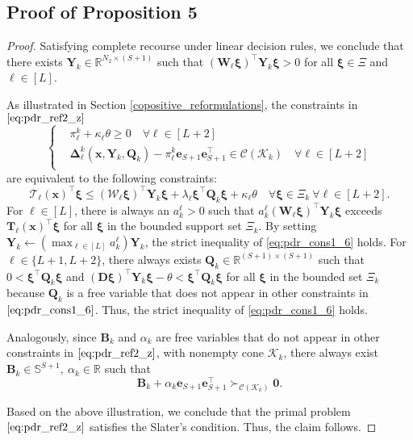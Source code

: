 \documentclass{article}
\newcommand{\RR}{\mathbb{R}}
\begin{document}
\subsection{Proof of Proposition 5}
\begin{proof}
Satisfying complete recourse under linear decision rules, we conclude that there exists $\bm Y_k \in \RR^{N_2 \times (S+1)}$ such that $(\bm W_\ell\bm \xi)^\top \bm Y_k \bm \xi > 0$ for all $\bm \xi \in \Xi$ and $\ell \in [L]$.

As illustrated in Section \ref{copositive_reformulations}, the constraints in $\eqref{eq:pdr_ref2_z}$
\begin{equation*}
\left \{
\begin{aligned}
 & \pi^k_\ell + \kappa_\ell \theta \geq 0 \quad \forall \ell \in [L+2] \\
 & \bm \Delta^k_\ell(\bm x,\bm Y_k,\bm Q_k) - \pi^k_\ell \mathbf{e}_{S+1} \mathbf{e}_{S+1}^\top 
\in \mathcal{C} (\mathcal K_k) \quad \forall \ell \in [L+2]  \\
\end{aligned}
\right.
\end{equation*}
are equivalent to the following constraints:
\begin{equation}
\label{eq:pdr_cons1_6}
\bm{\mathcal{T}}_\ell (\bm x)^\top\bm \xi  \leq (\bm{\mathcal{W}}_\ell \bm\xi)^\top\bm Y_k\bm\xi + \lambda_\ell \bm \xi^\top \bm Q_k \bm \xi + \kappa_\ell \theta  \quad \forall \bm\xi \in \Xi_k \ \forall \ell \in [L+2].    
\end{equation}
For $\ell \in [L]$, there is always an $a_k^\ell > 0$ such that $a_k^\ell(\bm W_\ell \bm \xi)^\top \bm Y_k \bm \xi$ exceeds $\bm T_\ell(\bm x)^\top \bm \xi$ for all $\bm \xi$ in the bounded support set $\Xi_k$. By setting $\bm Y_k\leftarrow (\max_{\ell\in[L]}a^\ell_k) \bm Y_k$, the strict inequality of \eqref{eq:pdr_cons1_6} holds. For $\ell \in \{L+1, L+2\}$, there always exists $\bm Q_k \in \RR^{(S+1) \times (S+1)}$ such that $0 < \bm \xi^\top \bm Q_k \bm \xi$ and $(\bm D \bm \xi)^\top \bm Y_k \bm \xi - \theta< \bm \xi^\top \bm Q_k \bm \xi$ for all $\bm \xi$ in the bounded set $\Xi_k$ because $\bm Q_k$ is a free variable that does not appear in other constraints in $\eqref{eq:pdr_cons1_6}$. Thus, the strict inequality of \eqref{eq:pdr_cons1_6} holds.

Analogously, since $\bm B_k$ and $\alpha_k$ are free variables that do not appear in other constraints in $\eqref{eq:pdr_ref2_z}$, with nonempty cone $\mathcal{K}_k$, there always exist $\bm B_k \in \mathbb{S}^{S+1}, \ \alpha_k \in \RR$ such that
\begin{equation*}
    \bm B_k + \alpha_k \mathbf{e}_{S+1} \mathbf{e}_{S+1}^\top \succ_{\mathcal{C}(\mathcal{K}_k)} \bm 0.
\end{equation*}

Based on the above illustration, we conclude that the primal problem $\eqref{eq:pdr_ref2_z}$ satisfies the Slater's condition. Thus, the claim follows. 
\end{proof}
\end{document}
